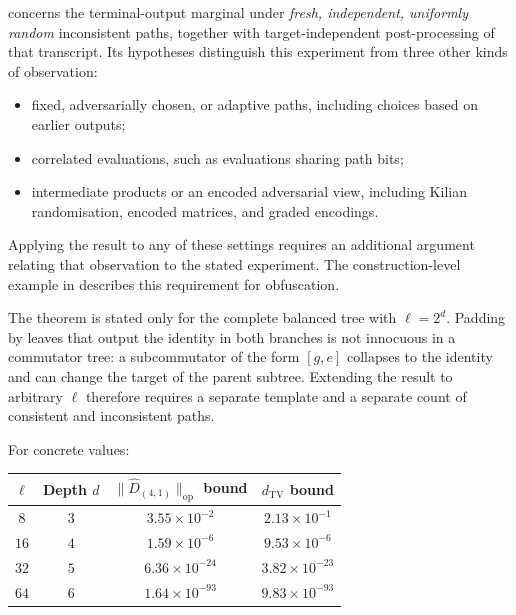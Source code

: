 \documentclass[version=final]{iacrcc}
\newcommand{\norm}[1]{\lVert #1 \rVert}
\newcommand{\opn}[1]{\norm{#1}_{\mathrm{op}}}
\newcommand{\dtv}{d_{\mathrm{TV}}}
\newcommand{\Dhat}{\widehat{D}}
\begin{document}
\begin{remark}
\label{rem:terminal-limits}
 concerns the terminal-output marginal under \emph{fresh,
independent, uniformly random} inconsistent paths, together with
target-independent post-processing of that transcript. Its hypotheses distinguish
this experiment from three other kinds of observation:
\begin{itemize}[nosep,leftmargin=1.2em]
\item fixed, adversarially chosen, or adaptive paths, including choices based
  on earlier outputs;
\item correlated evaluations, such as evaluations sharing path bits;
\item intermediate products or an encoded adversarial view, including Kilian
  randomisation, encoded matrices, and graded encodings.
\end{itemize}
Applying the result to any of these settings requires an additional argument
relating that observation to the stated experiment. The construction-level
example in  describes this requirement for obfuscation.
\end{remark}

\begin{remark}
\label{rem:padding}
The theorem is stated only for the complete balanced tree with $\ell = 2^d$.
Padding by leaves that output the identity in both branches is not innocuous in
a commutator tree: a subcommutator of the form $[g,e]$ collapses to the identity
and can change the target of the parent subtree. Extending the result to
arbitrary $\ell$ therefore requires a separate template and a separate count of
consistent and inconsistent paths.
\end{remark}

For concrete values:
\begin{center}
\begin{tabular}{cccc}
\toprule
$\ell$ & Depth $d$ & $\opn{\Dhat_{(4,1)}}$ bound & $\dtv$ bound \\
\midrule
$8$   & $3$ & $3.55 \times 10^{-2}$ & $2.13 \times 10^{-1}$ \\
$16$  & $4$ & $1.59 \times 10^{-6}$ & $9.53 \times 10^{-6}$ \\
$32$  & $5$ & $6.36 \times 10^{-24}$ & $3.82 \times 10^{-23}$ \\
$64$  & $6$ & $1.64 \times 10^{-93}$ & $9.83 \times 10^{-93}$ \\
\bottomrule
\end{tabular}
\end{center}
\end{document}
